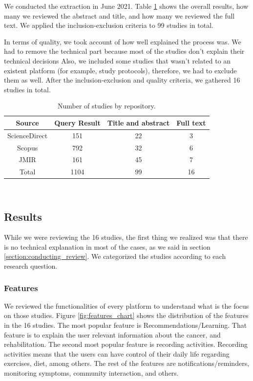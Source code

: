 \documentclass[conference]{IEEEtran}
\begin{document}
We conducted the extraction in June 2021. Table \ref{table:review_results} shows the overall results, how many we reviewed the abstract and title, and how many we reviewed the full text. We applied the inclusion-exclusion criteria to 99 studies in total.

In terms of quality, we took account of how well explained the process was. We had to remove the technical part because most of the studies don't explain their technical decisions Also, we included some studies that wasn't related to an existent platform (for example, study protocols), therefore, we had to exclude them as well. After the inclusion-exclusion and quality criteria, we gathered 16 studies in total.

\begin{table}[h!]
\centering
\begin{tabular}{||c c c c ||} 
\hline
Source & Query Result & Title and abstract & Full text \\
\hline\hline
ScienceDirect & 151 & 22 & 3 \\ 
Scopus & 792 & 32 & 6 \\ 
JMIR & 161 & 45 & 7 \\ 
Total & 1104 & 99 & 16 \\
\hline
\end{tabular} \\ [1ex] 
\caption{Number of studies by repository.}
\label{table:review_results}
\end{table}


\subsection{Results}

While we were reviewing the 16 studies, the first thing we realized was that there is no technical explanation in most of the cases, as we said in section \ref{section:conducting_review}. We categorized the studies according to each research question.

\subsubsection{Features}

We reviewed the functionalities of every platform to understand what is the focus on those studies. Figure \ref{fig:features_chart} shows the distribution of the features in the 16 studies. The most popular feature is Recommendations/Learning. That feature is to explain the user relevant information about the cancer, and rehabilitation. The second most popular feature is recording activities. Recording activities means that the users can have control of their daily life regarding exercises, diet, among others. The rest of the features are notifications/reminders, monitoring symptoms, community interaction, and others.
\end{document}
